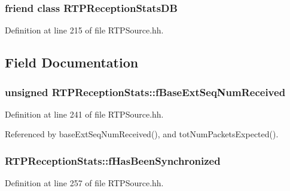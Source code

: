 \subsubsection[{R\+T\+P\+Reception\+Stats\+D\+B}]{\setlength{\rightskip}{0pt plus 5cm}friend class {\bf R\+T\+P\+Reception\+Stats\+D\+B}\hspace{0.3cm}{\ttfamily [friend]}}\label{classRTPReceptionStats_a4fec7ae8849ae370874e91e8596577df}


Definition at line 215 of file R\+T\+P\+Source.\+hh.



\subsection{Field Documentation}
\subsubsection[{f\+Base\+Ext\+Seq\+Num\+Received}]{\setlength{\rightskip}{0pt plus 5cm}unsigned R\+T\+P\+Reception\+Stats\+::f\+Base\+Ext\+Seq\+Num\+Received\hspace{0.3cm}{\ttfamily [protected]}}\label{classRTPReceptionStats_a0903ef9252aeda957044cae5355034a1}


Definition at line 241 of file R\+T\+P\+Source.\+hh.



Referenced by base\+Ext\+Seq\+Num\+Received(), and tot\+Num\+Packets\+Expected().

\subsubsection[{f\+Has\+Been\+Synchronized}]{ R\+T\+P\+Reception\+Stats\+::f\+Has\+Been\+Synchronized\hspace{0.3cm}{\ttfamily [private]}}\label{classRTPReceptionStats_aeddd6b406d6bbaff21fc43de7fe9bbac}


Definition at line 257 of file R\+T\+P\+Source.\+hh.

